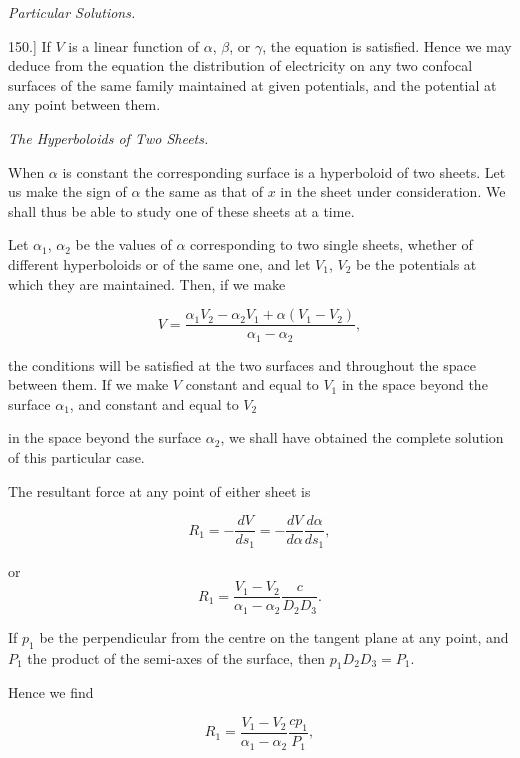 \documentclass[11pt,a4paper]{article}
\begin{document}
{\centering\itshape Particular Solutions.\par}

150.] If $V$ is a linear function of $\alpha$, $\beta$, or $\gamma$, the equation is satisfied. Hence we may deduce from the equation the distribution of electricity on any two confocal surfaces of the same family maintained at given potentials, and the potential at any point between them.

{\centering\itshape The Hyperboloids of Two Sheets.\par}

When $\alpha$ is constant the corresponding surface is a hyperboloid of two sheets. Let us make the sign of $\alpha$ the same as that of $x$ in the sheet under consideration. We shall thus be able to study one of these sheets at a time.

Let $\alpha_1$, $\alpha_2$ be the values of $\alpha$ corresponding to two single sheets, whether of different hyperboloids or of the same one, and let $V_1$, $V_2$ be the potentials at which they are maintained. Then, if we make

\begin{equation}\tag{18}
V=\frac{\alpha_1V_2-\alpha_2V_1+\alpha(V_1-V_2)}{\alpha_1-\alpha_2},
\end{equation}

the conditions will be satisfied at the two surfaces and throughout the space between them. If we make $V$ constant and equal to $V_1$ in the space beyond the surface $\alpha_1$, and constant and equal to $V_2$

in the space beyond the surface $\alpha_2$, we shall have obtained the complete solution of this particular case.

The resultant force at any point of either sheet is

\begin{equation}\tag{19}
R_1=-\frac{dV}{ds_1}=-\frac{dV}{d\alpha}\frac{d\alpha}{ds_1},
\end{equation}

or 
\begin{equation}\tag{20}
R_1=\frac{V_1-V_2}{\alpha_1-\alpha_2}\frac{c}{D_2D_3}.
\end{equation}

If $p_1$ be the perpendicular from the centre on the tangent plane at any point, and $P_1$ the product of the semi-axes of the surface, then $p_1D_2D_3=P_1$.

Hence we find

\begin{equation}\tag{21}
R_1=\frac{V_1-V_2}{\alpha_1-\alpha_2}\frac{cp_1}{P_1},
\end{equation}
\end{document}
